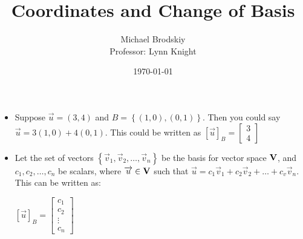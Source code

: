 \documentclass[12pt]{article}
\title{Coordinates and Change of Basis}
\date{\today}
\author{Michael Brodskiy\\ \small Professor: Lynn Knight}
\begin{document}
\maketitle

\begin{itemize}

  \item Suppose $\overrightarrow{u}=(3,4)$ and $B=\left\{ (1,0), (0,1) \right\}$. Then you could say $\overrightarrow{u}=3(1,0)+4(0,1)$. This could be written as $[\overrightarrow{u}]_B=\begin{bmatrix} 3\\ 4 \end{bmatrix}$

  \item Let the set of vectors $\left\{ \overrightarrow{v}_1,\overrightarrow{v}_2,\dots,\overrightarrow{v}_n \right\}$ be the basis for vector space $\bold{V}$, and $c_1,c_2,\dots,c_n$ be scalars, where $\overrightarrow{u} \in \bold{V}$ such that $\overrightarrow{u}=c_1\overrightarrow{v}_1+c_2\overrightarrow{v}_2+\dots+c_v\overrightarrow{v}_n$. This can be written as:
    \begin{center}
      $[\overrightarrow{u}]_B=\begin{bmatrix} c_1\\c_2\\\vdots\\c_n\end{bmatrix}$
    \end{center}

\end{itemize}
\end{document}
